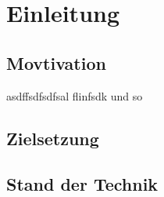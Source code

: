 \chapter{Einleitung}


\section{Movtivation}

asdffsdfsdfsal flinfsdk und so \cite{bib:TheLinuxKernelModuleProgrammingGuide}


\section{Zielsetzung}





\section{Stand der Technik}

